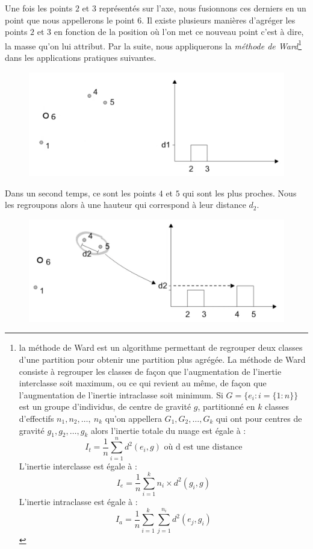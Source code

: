 Une fois les points $2$ et $3$ représentés sur l'axe, nous fusionnons ces derniers en un point que nous appellerons le point $6$. Il existe plusieurs manières d'agréger les points $2$ et $3$ en fonction de la position où l'on met ce nouveau point c'est à dire, la masse qu'on lui attribut. Par la suite, nous appliquerons la \textit{méthode de Ward}\footnote{la méthode de Ward est un algorithme permettant de regrouper deux classes d'une partition pour obtenir une partition plus agrégée. La méthode de Ward consiste à regrouper les classes de façon que l'augmentation de l'inertie interclasse soit maximum, ou ce qui revient au même, de façon que l'augmentation de l'inertie intraclasse soit minimum.\newline
Si $G = \{ e_{i} : i = \{1:n\} \}$ est un groupe d'individus, de centre de gravité $g$, partitionné en $k$ classes d'effectifs $n_{1},n_{2}, \dots, ~ n_{k}$ qu'on appellera $G_{1}, G_{2}, \dots,G_{k}$ qui ont pour centres de gravité $g_{1},g_{2}, \dots,g_{k}$ alors l'inertie totale du nuage est égale à :
$$I_{t} = \frac{1}{n}\sum_{i=1}^{n} d^{2}(e_{i},g)\textrm{ où d est une distance}$$
L'inertie interclasse est égale à : $$I_{e} = \frac{1}{n}\sum_{i=1}^{k} n_{i} \times d^{2}(g_{i},g)$$
L'inertie intraclasse est égale à : $$I_{a} = \frac{1}{n}\sum_{i=1}^{k} \sum_{j=1}^{n_i} d^{2}(e_{j},g_{i})$$} dans les applications pratiques suivantes.

\begin{figure}[H]\begin{center}\includegraphics[scale=0.5]{ilu/ClassHierarConstruc2.png}\end{center}\end{figure}

Dans un second temps, ce sont les points $4$ et $5$ qui sont les plus proches. Nous les regroupons alors à une hauteur qui correspond à leur distance $d_{2}$.

\begin{figure}[H]\begin{center}\includegraphics[scale=0.5]{ilu/ClassHierarConstruc3.png}\end{center}\end{figure}

